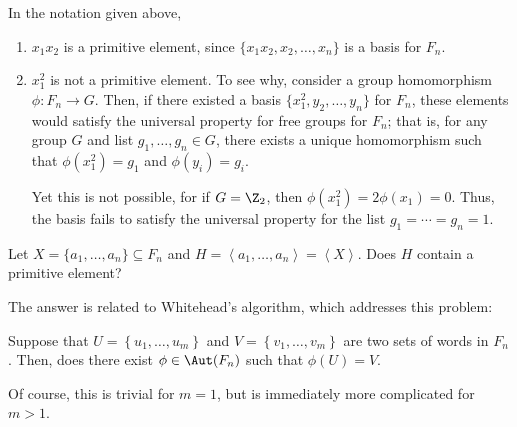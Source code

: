 \documentclass[12pt]{article}
\begin{document}
\begin{example}\label{exam:Examples_of_Primitive_Elements}
    In the notation given above,\\

    \begin{enumerate}
        \itemsep1em
        \item $x_1x_2$ is a primitive element, since $\{x_1x_2, x_2, \ldots, x_n\}$ is a basis for $F_n$.
        \item $x_1^2$ is not a primitive element. To see why, consider a group homomorphism $\phi: F_n \rightarrow G$. Then, if there existed a basis $\{x_1^2, y_2, \ldots, y_n\}$ for $F_n$, these elements would satisfy the universal property for free groups for $F_n$; that is, for any group $G$ and list $g_1,\ldots,g_n \in G$, there exists a unique homomorphism such that $\phi(x_1^2) = g_1$ and $\phi(y_i) = g_i$. 

            Yet this is not possible, for if $G = \Z_2$, then $\phi(x_1^2) = 2\phi(x_1) = 0$. Thus, the basis fails to satisfy the universal property for the list $g_1 = \cdots = g_n = 1$.
    \end{enumerate}
\end{example}

\begin{problem}\label{prob:Classifying_Primitive_Elements}
    Let $X = \{a_1, \ldots, a_n\} \subseteq F_n$ and $H = \left<a_1, \ldots, a_n\right> = \left<X\right>$. Does $H$ contain a primitive element?
\end{problem}

The answer is related to Whitehead's algorithm, which addresses this problem: 

\begin{problem}\label{prob:Automorphisms_on_sets_of_n_words}
    Suppose that $U = \left\{u_1, \ldots, u_m\right\}$ and $V = \left\{v_1, \ldots, v_m\right\}$ are two sets of words in $F_n$. Then, does there exist $\phi \in \Aut(F_n)$ such that $\phi(U) = V$.
\end{problem}

Of course, this is trivial for $m = 1$, but is immediately more complicated for $m > 1$.
\end{document}
